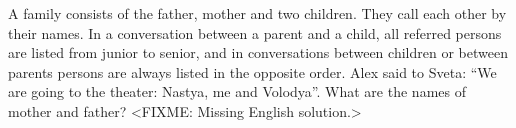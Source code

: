 \problem{}
A family consists of the father, mother and two children.
They call each other by their names.
In a conversation between a parent and a child, all referred persons are listed
from junior to senior,
and in conversations between children or between parents persons are always
listed in the opposite order.
Alex said to Sveta: ``We are going to the theater: Nastya, me and Volodya''.
What are the names of mother and father?
\solution
<FIXME: Missing English solution.>
\endproblem
